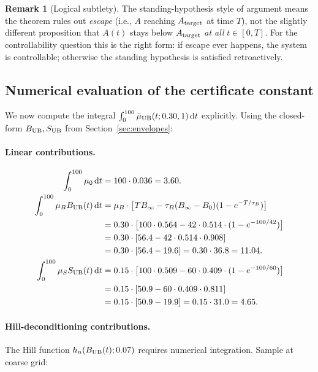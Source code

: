 \documentclass[11pt,a4paper]{article}
\theoremstyle{definition}
\newtheorem{remark}[theorem]{Remark}
\newcommand{\dd}{\,\mathrm{d}}
\begin{document}
\begin{remark}[Logical subtlety]
The standing-hypothesis style of argument means the theorem rules out \emph{escape} (i.e., $A$ reaching $A_{\rm target}$ at time $T$), not the slightly different proposition that $A(t)$ stays below $A_{\rm target}$ \emph{at all} $t \in [0, T]$. For the controllability question this is the right form: if escape ever happens, the system is controllable; otherwise the standing hypothesis is satisfied retroactively.
\end{remark}

\subsection{Numerical evaluation of the certificate constant}

We now compute the integral $\int_0^{100} \bar\mu_{\rm UB}(t; 0.30, 1) \dd t$ explicitly. Using the closed-form $B_{\rm UB}, S_{\rm UB}$ from Section~\ref{sec:envelopes}:

\paragraph{Linear contributions.}
\begin{align*}
\int_0^{100} \mu_0 \dd t &= 100 \cdot 0.036 = 3.60. \\
\int_0^{100} \mu_B B_{\rm UB}(t) \dd t &= \mu_B \cdot \big[T B_\infty - \tau_B(B_\infty - B_0)(1 - e^{-T/\tau_B})\big] \\
&= 0.30 \cdot \big[100 \cdot 0.564 - 42 \cdot 0.514 \cdot (1 - e^{-100/42})\big] \\
&= 0.30 \cdot [56.4 - 42 \cdot 0.514 \cdot 0.908] \\
&= 0.30 \cdot [56.4 - 19.6] = 0.30 \cdot 36.8 = 11.04. \\
\int_0^{100} \mu_S S_{\rm UB}(t) \dd t &= 0.15 \cdot \big[100 \cdot 0.509 - 60 \cdot 0.409 \cdot (1 - e^{-100/60})\big] \\
&= 0.15 \cdot [50.9 - 60 \cdot 0.409 \cdot 0.811] \\
&= 0.15 \cdot [50.9 - 19.9] = 0.15 \cdot 31.0 = 4.65.
\end{align*}

\paragraph{Hill-deconditioning contributions.}
The Hill function $h_n(B_{\rm UB}(t); 0.07)$ requires numerical integration. Sample at coarse grid:
\end{document}
